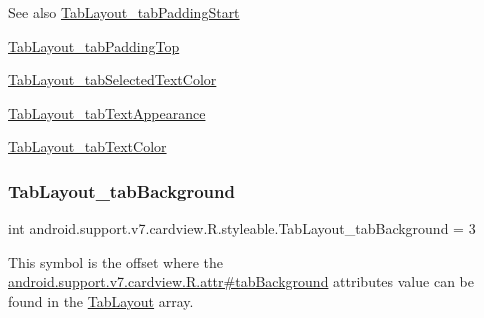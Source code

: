 \begin{DoxySeeAlso}{See also}
\hyperlink{classandroid_1_1support_1_1v7_1_1cardview_1_1R_1_1styleable_ad6c26e7168880fb2f4068b1ae3d08955}{Tab\+Layout\+\_\+tab\+Padding\+Start} 

\hyperlink{classandroid_1_1support_1_1v7_1_1cardview_1_1R_1_1styleable_a0d0eb9efbce84535b45c5779754d6dd3}{Tab\+Layout\+\_\+tab\+Padding\+Top} 

\hyperlink{classandroid_1_1support_1_1v7_1_1cardview_1_1R_1_1styleable_abd3588bf878b74235a5268f7295f3b4f}{Tab\+Layout\+\_\+tab\+Selected\+Text\+Color} 

\hyperlink{classandroid_1_1support_1_1v7_1_1cardview_1_1R_1_1styleable_aac67299d9b8c00968768c8064795f58f}{Tab\+Layout\+\_\+tab\+Text\+Appearance} 

\hyperlink{classandroid_1_1support_1_1v7_1_1cardview_1_1R_1_1styleable_a7fa5e53bc11e58338a76405ddc2a9fd8}{Tab\+Layout\+\_\+tab\+Text\+Color} 
\end{DoxySeeAlso}
\mbox{\label{classandroid_1_1support_1_1v7_1_1cardview_1_1R_1_1styleable_a92606b2725987ce07684e8a6f7e3e136}} 
\subsubsection{\texorpdfstring{Tab\+Layout\+\_\+tab\+Background}{TabLayout\_tabBackground}}
{\footnotesize\ttfamily int android.\+support.\+v7.\+cardview.\+R.\+styleable.\+Tab\+Layout\+\_\+tab\+Background = 3\hspace{0.3cm}{\ttfamily [static]}}

This symbol is the offset where the \hyperlink{classandroid_1_1support_1_1v7_1_1cardview_1_1R_1_1attr_afbb4b95c4751cc3b349627d941ac9d92}{android.\+support.\+v7.\+cardview.\+R.\+attr\#tab\+Background} attribute\textquotesingle{}s value can be found in the \hyperlink{classandroid_1_1support_1_1v7_1_1cardview_1_1R_1_1styleable_afa0dc9366603eaec9e38d99273ba8512}{Tab\+Layout} array.

